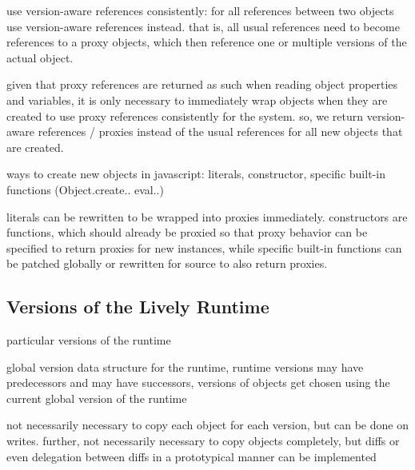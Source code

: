 use version-aware references consistently:
for all references between two objects use version-aware references instead. that is, all usual references need to become references to a proxy objects, which then reference one or multiple versions of the actual object.

given that proxy references are returned as such when reading object properties and variables, it is only necessary to immediately wrap objects when they are created to use proxy references consistently for the system. so, we return version-aware references / proxies instead of the usual references for all new objects that are created.

ways to create new objects in javascript: literals, constructor, specific built-in functions (Object.create.. eval..)

literals can be rewritten to be wrapped into proxies immediately. constructors are functions, which should already be proxied so that proxy behavior can be specified to return proxies for new instances, while specific built-in functions can be patched globally or rewritten for source to also return proxies.



\subsection{Versions of the Lively Runtime}

particular versions of the runtime

global version data structure for the runtime, runtime versions may have predecessors and may have successors, versions of objects get chosen using the current global version of the runtime

not necessarily necessary to copy each object for each version, but can be done on writes. further, not necessarily necessary to copy objects completely, but diffs or even delegation between diffs in a prototypical manner can be implemented
